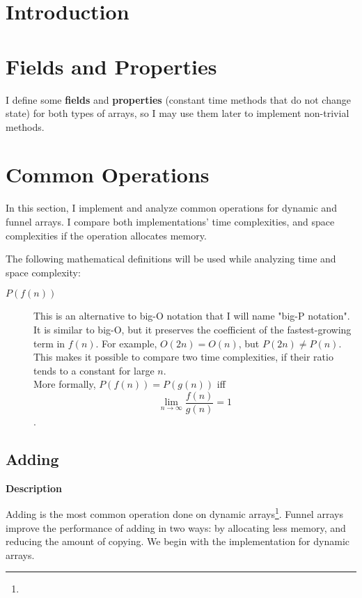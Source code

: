\documentclass{article}
\newcommand{\descriptn}{\textbf{Description}}
\newcommand{\bigo}{O}
\newcommand{\biggo}{P}
\begin{document}
	\begin{abstract}
	\end{abstract}

	\section{Introduction}
	
	\section{Fields and Properties}
	
	I define some \textbf{fields} and \textbf{properties} (constant time methods that do not change state) for both types of arrays, so I may use them later to implement non-trivial methods.
	
	\section{Common Operations}
	
	In this section, I implement and analyze common operations for dynamic and funnel arrays. I compare both implementations' time complexities, and space complexities if the operation allocates memory.
	
	The following mathematical definitions will be used while analyzing time and space complexity:
	
	\begin{description}
		\item[$\biggo(f(n))$] This is an alternative to big-O notation that I will name "big-P notation". It is similar to big-O, but it preserves the coefficient of the fastest-growing term in $f(n)$. For example, $\bigo(2n) = \bigo(n)$, but $\biggo(2n) \neq \biggo(n)$. This makes it possible to compare two time complexities, if their ratio tends to a constant for large $n$.\\
		More formally, $\biggo(f(n)) = \biggo(g(n))$ iff $$\lim_{n \to \infty} {\frac{f(n)}{g(n)}} = 1$$.
	\end{description}
	
	\subsection{Adding}
	
	\descriptn
	
	Adding is the most common operation done on dynamic arrays\footnote{}. Funnel arrays improve the performance of adding in two ways: by allocating less memory, and reducing the amount of copying. We begin with the implementation for dynamic arrays.
	
\end{document}

